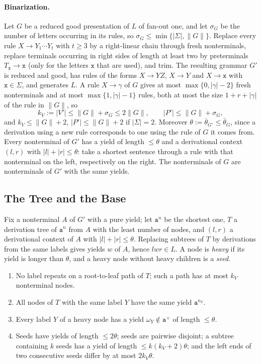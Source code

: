 \paragraph{Binarization.}
Let $G$ be a reduced good presentation of $L$ of fan-out one, and let
$\sigma_G$ be the number of letters occurring in its rules, so
$\sigma_G\le\min\{|\Sigma|,\|G\|\}$.  Replace every rule $X\to Y_1\cdots Y_t$
with $t\ge3$ by a right-linear chain through fresh nonterminals, replace
terminals occurring in right sides of length at least two by preterminals
$T_{\mathtt x}\to\mathtt x$ (only for the letters $\mathtt x$ that are used), and trim.
The resulting grammar $G'$ is reduced and good, has rules of the forms
$X\to YZ$, $X\to Y$ and $X\to\mathtt x$ with $\mathtt x\in\Sigma$, and generates $L$.
A rule $X\to\gamma$ of $G$ gives at most $\max\{0,|\gamma|-2\}$ fresh
nonterminals and at most $\max\{1,|\gamma|-1\}$ rules, both at most the size
$1+r+|\gamma|$ of the rule in $\|G\|$, so
\[
 k_V:=|V'|\le\|G\|+\sigma_G\le2\|G\|,\qquad |P'|\le\|G\|+\sigma_G,
\]
and $k_V\le\|G\|+2$, $|P'|\le\|G\|+2$ if $|\Sigma|=2$.  Moreover
$\theta:=\bar\theta_{G'}\le\bar\theta_G$, since a derivation using a new rule
corresponds to one using the rule of $G$ it comes from.  Every nonterminal of
$G'$ has a yield of length $\le\theta$ and a derivational context $(l,r)$ with
$|l|+|r|\le\theta$: take a shortest sentence through a rule with that
nonterminal on the left, respectively on the right.  The nonterminals of $G$
are nonterminals of $G'$ with the same yields.

\subsection{The Tree and the Base}

Fix a nonterminal $A$ of $G'$ with a pure yield; let $\mathtt a^n$ be the
shortest one, $T$ a derivation tree of $\mathtt a^n$ from $A$ with the least
number of nodes, and $(l,r)$ a derivational context of $A$ with
$|l|+|r|\le\theta$.  Replacing subtrees of $T$ by derivations from the same
labels gives yields $w$ of $A$, hence $lwr\in L$.  A node is \emph{heavy} if
its yield is longer than $\theta$, and a heavy node without heavy children is a
\emph{seed}.

\begin{lemma}
\label{lem:app-h-tree}
\begin{enumerate}[label=\textup{(\alph*)},leftmargin=*]
\item No label repeats on a root-to-leaf path of $T$; such a path has at
most $k_V$ nonterminal nodes.
\item All nodes of $T$ with the same label $Y$ have the same yield
$\mathtt a^{n_Y}$.
\item Every label $Y$ of a heavy node has a yield $\omega_Y\notin\mathtt a^+$ of
length $\le\theta$.
\item Seeds have yields of length $\le2\theta$; seeds are pairwise disjoint;
a subtree containing $k$ seeds has a yield of length $\le k(k_V+2)\theta$; and
the left ends of two consecutive seeds differ by at most $2k_V\theta$.
\end{enumerate}
\end{lemma}

